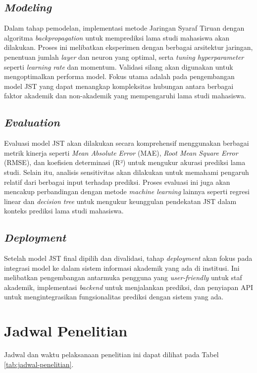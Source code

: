 \subsection{\textit{Modeling}}
Dalam tahap pemodelan, implementasi metode Jaringan Syaraf Tiruan dengan algoritma \textit{backpropagation} untuk memprediksi lama studi mahasiswa akan dilakukan. Proses ini melibatkan eksperimen dengan berbagai arsitektur jaringan, penentuan jumlah \textit{layer} dan neuron yang optimal, serta \textit{tuning hyperparameter} seperti \textit{learning rate} dan momentum. Validasi silang akan digunakan untuk mengoptimalkan performa model. Fokus utama adalah pada pengembangan model JST yang dapat menangkap kompleksitas hubungan antara berbagai faktor akademik dan non-akademik yang mempengaruhi lama studi mahasiswa.

\subsection{\textit{Evaluation}}
Evaluasi model JST akan dilakukan secara komprehensif menggunakan berbagai metrik kinerja seperti \textit{Mean Absolute Error} (MAE), \textit{Root Mean Square Error} (RMSE), dan koefisien determinasi (R²) untuk mengukur akurasi prediksi lama studi. Selain itu, analisis sensitivitas akan dilakukan untuk memahami pengaruh relatif dari berbagai input terhadap prediksi. Proses evaluasi ini juga akan mencakup perbandingan dengan metode \textit{machine learning} lainnya seperti regresi linear dan \textit{decision tree} untuk mengukur keunggulan pendekatan JST dalam konteks prediksi lama studi mahasiswa.

\subsection{\textit{Deployment}}
Setelah model JST final dipilih dan divalidasi, tahap \textit{deployment} akan fokus pada integrasi model ke dalam sistem informasi akademik yang ada di institusi. Ini melibatkan pengembangan antarmuka pengguna yang \textit{user-friendly} untuk staf akademik, implementasi \textit{backend} untuk menjalankan prediksi, dan penyiapan API untuk mengintegrasikan fungsionalitas prediksi dengan sistem yang ada.

\clearpage

\section{Jadwal Penelitian}
Jadwal dan waktu pelaksanaan penelitian ini dapat dilihat pada Tabel \ref{tab:jadwal-penelitian}. 

